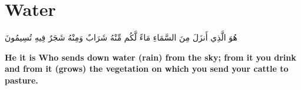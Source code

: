\chapter{Water}
\begin{center}
    {\Huge    
        \begin{Arabic}
            هُوَ الَّذِي أَنزَلَ مِنَ السَّمَاءِ مَاءً لَّكُم مِّنْهُ شَرَابٌ وَمِنْهُ شَجَرٌ فِيهِ تُسِيمُونَ
        \end{Arabic}
    }    
\end{center}
\vspace*{\fill}
\vspace{3cm}
\begin{center}
    \large \textbf{He it is Who sends down water (rain) from the sky; from it you drink and from it (grows) the vegetation on which you send your cattle to pasture.}
\end{center}
